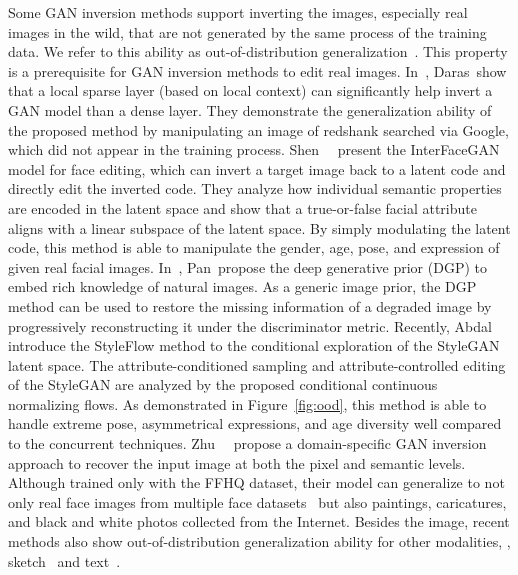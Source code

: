 Some GAN inversion methods support inverting the images, especially real images in the wild, that are not generated by the same process of the training data.
We refer to this ability as out-of-distribution generalization~\cite{ren2019likelihood,hendrycks2016baseline,lee2018simple}.
This property is a prerequisite for GAN inversion methods to edit real images.
In~\cite{daras2020your}, Daras~\etal show that a local sparse layer (based on local context) can significantly help invert a GAN model than a dense layer. 
They demonstrate the generalization ability of the proposed method by manipulating an image of redshank searched via Google, which did not appear in the training process. 
Shen~\etal~\cite{shen2020interpreting} present the InterFaceGAN model for face editing, which can invert a target image back to a latent code and directly edit the inverted code.
They analyze how individual semantic properties are encoded in the latent space and show that a true-or-false facial attribute aligns with a linear subspace of the latent space. 
By simply modulating the latent code, this method is able to manipulate the gender, age, pose, and expression of given real facial images.
In~\cite{pan2020exploiting}, Pan~\etal propose the deep generative prior (DGP) to embed rich knowledge of natural images.
As a generic image prior, the DGP method can be used to restore the missing information of a degraded image by progressively reconstructing it under the discriminator metric.
Recently, Abdal~\etal~\cite{abdal2020styleflow} introduce the StyleFlow method to the conditional exploration of the StyleGAN latent space. 
The attribute-conditioned sampling and attribute-controlled editing of the StyleGAN are analyzed by the proposed conditional continuous normalizing flows. 
As demonstrated in Figure~\ref{fig:ood}, this method is able to handle extreme pose, asymmetrical expressions, and age diversity well compared to the concurrent techniques.
Zhu~\etal~\cite{zhu2020indomain} propose a domain-specific GAN inversion approach to recover the input image at both the pixel and semantic levels.
Although trained only with the FFHQ dataset, their model can generalize to not only real face images from multiple face datasets~\cite{chelnokova2014rewards, courset2018caucasian, yi2019apdrawinggan} but also paintings, caricatures, and black and white photos collected from the Internet.
Besides the image, recent methods also show out-of-distribution generalization ability for other modalities, \ie, sketch~\cite{richardson2020encoding} and text~\cite{xia2020tedigan}.

\figood